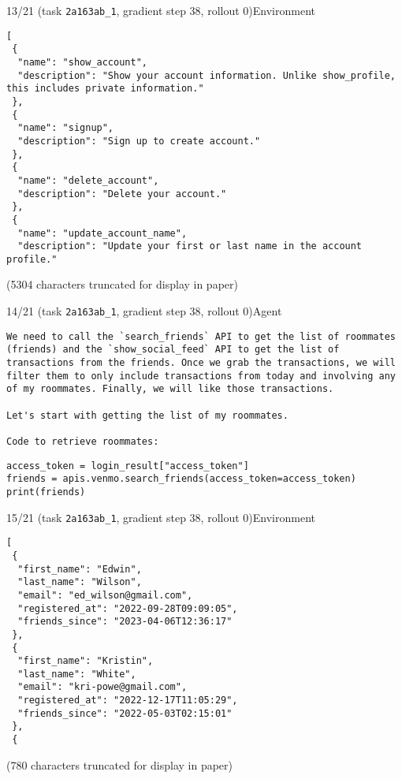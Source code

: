 \hspace*{8mm}%
\begin{minipage}{0.95\linewidth}
\begin{user_message_box}{{13/21 (task \texttt{2a163ab\_1}, gradient step 38, rollout 0)\hfill Environment}}
\scriptsize
\begin{Verbatim}[breaklines]
[
 {
  "name": "show_account",
  "description": "Show your account information. Unlike show_profile, this includes private information."
 },
 {
  "name": "signup",
  "description": "Sign up to create account."
 },
 {
  "name": "delete_account",
  "description": "Delete your account."
 },
 {
  "name": "update_account_name",
  "description": "Update your first or last name in the account profile."
\end{Verbatim}
(5304 characters truncated for display in paper)\end{user_message_box}
\end{minipage}

\begin{minipage}{0.95\linewidth}
\begin{assistant_message_box}{{14/21 (task \texttt{2a163ab\_1}, gradient step 38, rollout 0)\hfill Agent}}
\scriptsize
\begin{Verbatim}[breaklines]
We need to call the `search_friends` API to get the list of roommates (friends) and the `show_social_feed` API to get the list of transactions from the friends. Once we grab the transactions, we will filter them to only include transactions from today and involving any of my roommates. Finally, we will like those transactions.

Let's start with getting the list of my roommates.

Code to retrieve roommates:
\end{Verbatim}
\begin{tcolorbox}[colback=codebgcolor,boxrule=0pt]\begin{Verbatim}[breaklines]
access_token = login_result["access_token"]
friends = apis.venmo.search_friends(access_token=access_token)
print(friends)
\end{Verbatim}
\end{tcolorbox}\end{assistant_message_box}
\end{minipage}

\hspace*{8mm}%
\begin{minipage}{0.95\linewidth}
\begin{user_message_box}{{15/21 (task \texttt{2a163ab\_1}, gradient step 38, rollout 0)\hfill Environment}}
\scriptsize
\begin{Verbatim}[breaklines]
[
 {
  "first_name": "Edwin",
  "last_name": "Wilson",
  "email": "ed_wilson@gmail.com",
  "registered_at": "2022-09-28T09:09:05",
  "friends_since": "2023-04-06T12:36:17"
 },
 {
  "first_name": "Kristin",
  "last_name": "White",
  "email": "kri-powe@gmail.com",
  "registered_at": "2022-12-17T11:05:29",
  "friends_since": "2022-05-03T02:15:01"
 },
 {
\end{Verbatim}
(780 characters truncated for display in paper)\end{user_message_box}
\end{minipage}

